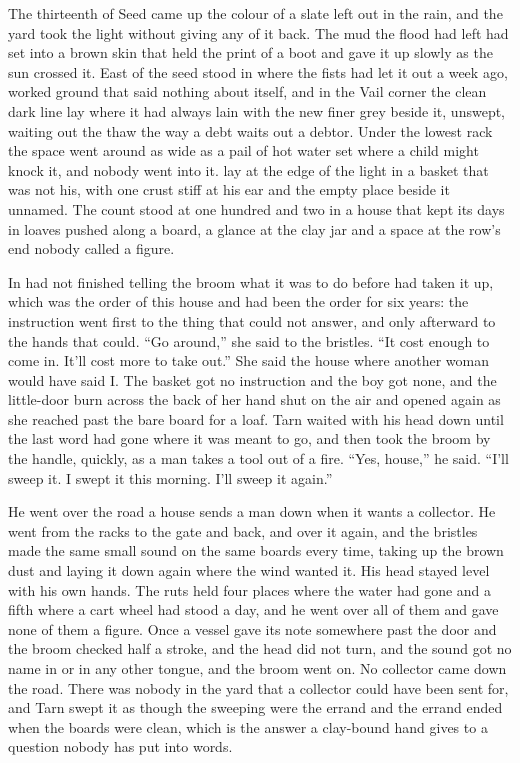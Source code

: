 
The thirteenth of Seed came up the colour of a slate left out in the rain, and the yard took the light without giving any of it back. The mud the flood had left had set into a brown skin that held the print of a boot and gave it up slowly as the sun crossed it. East of  the seed stood in  where the fists had let it out a week ago, worked ground that said nothing about itself, and in the Vail corner the clean dark line lay where it had always lain with the new finer grey beside it, unswept, waiting out the thaw the way a debt waits out a debtor. Under the lowest rack the space went around as wide as a pail of hot water set where a child might knock it, and nobody went into it.  lay at the edge of the light in a basket that was not his, with one crust stiff at his ear and the empty place beside it unnamed. The count stood at one hundred and two in a house that kept its days in loaves pushed along a board, a glance at the clay jar and a space at the row's end nobody called a figure.

In   had not finished telling the broom what it was to do before  had taken it up, which was the order of this house and had been the order for six years: the instruction went first to the thing that could not answer, and only afterward to the hands that could. “Go around,” she said to the bristles. “It cost enough to come in. It'll cost more to take out.” She said the house where another woman would have said I. The basket got no instruction and the boy got none, and the little-door burn across the back of her hand shut on the air and opened again as she reached past the bare board for a loaf. Tarn waited with his head down until the last word had gone where it was meant to go, and then took the broom by the handle, quickly, as a man takes a tool out of a fire. “Yes, house,” he said. “I'll sweep it. I swept it this morning. I'll sweep it again.”

He went over the road a house sends a man down when it wants a collector. He went from the racks to the gate and back, and over it again, and the bristles made the same small sound on the same boards every time, taking up the brown dust and laying it down again where the wind wanted it. His head stayed level with his own hands. The ruts held four places where the water had gone and a fifth where a cart wheel had stood a day, and he went over all of them and gave none of them a figure. Once a vessel gave its note somewhere past the door and the broom checked half a stroke, and the head did not turn, and the sound got no name in  or in any other tongue, and the broom went on. No collector came down the road. There was nobody in the yard that a collector could have been sent for, and Tarn swept it as though the sweeping were the errand and the errand ended when the boards were clean, which is the answer a clay-bound hand gives to a question nobody has put into words.

